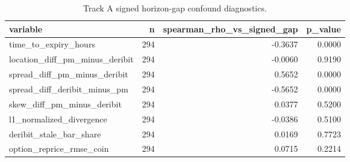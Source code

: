 \begin{table}
\caption{Track A signed horizon-gap confound diagnostics.}
\label{tab:trackA_gap_confound_diagnostics}
\begin{tabular}{lrrr}
\toprule
variable & n & spearman\_rho\_vs\_signed\_gap & p\_value \\
\midrule
time\_to\_expiry\_hours & 294 & -0.3637 & 0.0000 \\
location\_diff\_pm\_minus\_deribit & 294 & -0.0060 & 0.9190 \\
spread\_diff\_pm\_minus\_deribit & 294 & 0.5652 & 0.0000 \\
spread\_diff\_deribit\_minus\_pm & 294 & -0.5652 & 0.0000 \\
skew\_diff\_pm\_minus\_deribit & 294 & 0.0377 & 0.5200 \\
l1\_normalized\_divergence & 294 & -0.0386 & 0.5100 \\
deribit\_stale\_bar\_share & 294 & 0.0169 & 0.7723 \\
option\_reprice\_rmse\_coin & 294 & 0.0715 & 0.2214 \\
\bottomrule
\end{tabular}
\end{table}
